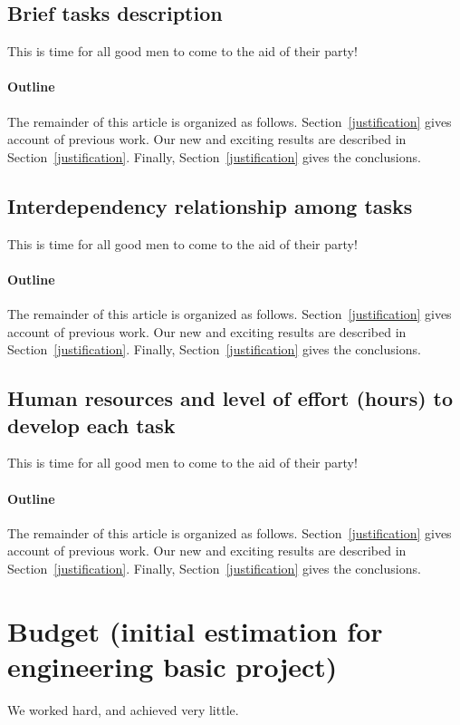 \documentclass[12pt, titlepage]{article}
\begin{document}
\subsection{Brief tasks description}
This is time for all good men to come to the aid of their party!

\paragraph{Outline}
The remainder of this article is organized as follows.
Section~\ref{justification} gives account of previous work.
Our new and exciting results are described in Section~\ref{justification}.
Finally, Section~\ref{justification} gives the conclusions.

\subsection{Interdependency relationship among tasks}
This is time for all good men to come to the aid of their party!

\paragraph{Outline}
The remainder of this article is organized as follows.
Section~\ref{justification} gives account of previous work.
Our new and exciting results are described in Section~\ref{justification}.
Finally, Section~\ref{justification} gives the conclusions.

\subsection{Human resources and level of effort (hours) to develop each task}
This is time for all good men to come to the aid of their party!

\paragraph{Outline}
The remainder of this article is organized as follows.
Section~\ref{justification} gives account of previous work.
Our new and exciting results are described in Section~\ref{justification}.
Finally, Section~\ref{justification} gives the conclusions.


\section{Budget (initial estimation for engineering basic project)}
We worked hard, and achieved very little.

\pagebreak


\end{document}
